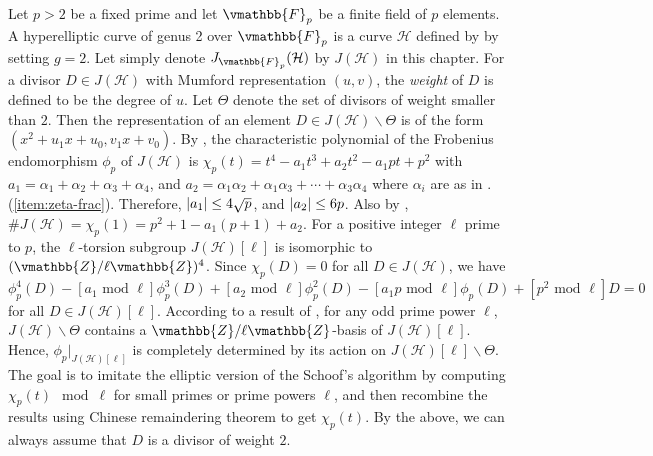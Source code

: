 Let $p > 2$ be a fixed prime and let $\vmathbb{F}_p$ be a finite field of $p$ elements. A 
hyperelliptic curve of genus 2 over $\vmathbb{F}_p$ is a curve $\mathcal{H}$ defined by 
 by setting $g = 2$. Let simply denote 
$J_{\vmathbb{F}_{p}}(\mathcal{H})$ by $J(\mathcal{H})$ in this chapter. For a divisor $D \in 
J(\mathcal{H})$ with Mumford representation $(u, v)$, the \textit{weight} of $D$ is defined to be 
the degree of $u$. Let $\Theta$ denote the set of divisors of weight smaller than $2$. Then the 
representation of an element $D \in J(\mathcal{H}) \backslash \Theta$ is of the form $(x^2 + u_1x + 
u_0, v_1x + v_0)$. By , the characteristic polynomial of the 
Frobenius endomorphism $\phi_p$ of $J(\mathcal{H})$ is $\chi_p(t) = t^{4} - a_1t^{3} + a_2t^2 - 
a_1pt + p^2$ with $a_1 = \alpha_1 + \alpha_2 + \alpha_3 + \alpha_4$, and $a_2 = \alpha_1\alpha_2 + 
\alpha_1\alpha_3 +\cdots + \alpha_3\alpha_4$ where $\alpha_i$ are as in 
.(\ref{item:zeta-frac}). Therefore, $\left\vert a_1\right\vert \le 4\sqrt{p}$, and 
$\left\vert a_2\right\vert \le 6p$. Also by , $\#J(\mathcal{H}) = \chi_p(1) = p^2 
+ 1 - a_1(p + 1) + a_2$. For a positive integer  $\ell$ prime to $p$, the $\ell$-torsion subgroup 
$J(\mathcal{H})[\ell]$ is isomorphic to $(\vmathbb{Z} / \ell\vmathbb{Z})^4$. Since $\chi_p(D) = 0$ for 
all $D \in J(\mathcal{H})$, we have
\begin{equation}
\label{equation:Frob-genus2}
\phi_p^{4}(D) - [a_1 \text{ mod } \ell]\phi_p^{3}(D) + [a_2 \text{ mod } \ell]\phi_p^2(D) - [a_1p 
\text{ mod } \ell]\phi_p(D) + [p^2 \text{ mod } \ell]D = 0
\end{equation}
for all $D \in J(\mathcal{H})[\ell]$. According to a result of \cite{Kampkotter1991}, for any odd 
prime power $\ell$, $J(\mathcal{H}) \backslash \Theta$ contains a $\vmathbb{Z} / 
\ell\vmathbb{Z}$-basis of $J(\mathcal{H})[\ell]$. Hence, $\phi_p \vert_{J(\mathcal{H})[\ell]}$ is 
completely determined by its action on $J(\mathcal{H})[\ell] \backslash \Theta$. The goal is to 
imitate the elliptic version of the Schoof's algorithm by computing $\chi_p(t) \mod \ell$ for small 
primes or prime powers $\ell$, and then recombine the results using Chinese remaindering theorem to 
get $\chi_p(t)$. By the above, we can always assume that $D$ is a divisor of weight $2$.











